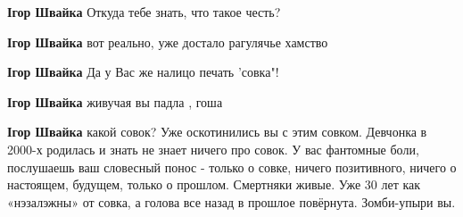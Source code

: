\begin{itemize}
\begin{itemize}
 
\textbf{Ігор Швайка} Откуда тебе знать, что такое честь?

 
\textbf{Ігор Швайка} вот реально, уже достало рагулячье хамство

 
\textbf{Ігор Швайка} Да у Вас же налицо печать 'совка"!

 
\textbf{Ігор Швайка} живучая вы падла , гоша

 
\textbf{Ігор Швайка} какой совок? Уже оскотинились вы с этим совком. Девчонка в
2000-х родилась и знать не знает ничего про совок. У вас фантомные боли,
послушаешь ваш словесный понос - только о совке, ничего позитивного, ничего о
настоящем, будущем, только о прошлом. Смертняки живые. Уже 30 лет как
«нэзалэжны» от совка, а голова все назад в прошлое повёрнута. Зомби-упыри вы.

 

\end{itemize}
\end{itemize}
